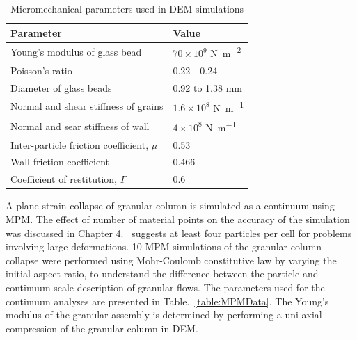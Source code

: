 \begin{table}
\caption{Micromechanical parameters used in DEM simulations}
\label{table:MDdata}
\centering
\begin{tabular}{ll}
\toprule
\textbf{Parameter} & \textbf{Value} \\ \midrule
Young's modulus of glass bead & $70\times10^{9}$ \si{\newton\per\m\squared}\\ 
Poisson's ratio & 0.22 - 0.24\\ 
Diameter of glass beads & 0.92 to 1.38 \si{\mm}\\
Normal and shear stiffness of grains & $1.6 \times 10^{8}$ \si{\newton\per\m}\\ 
Normal and sear stiffness of wall & $4 \times 10^{8}$ \si{\newton\per\m}\\
Inter-particle friction coefficient, $\mu$ & 0.53 \\
Wall friction coefficient & 0.466 \\ 
Coefficient of restitution, $\Gamma$ & 0.6 \\ \bottomrule
\end{tabular}
\end{table}

A plane strain collapse of granular column is simulated as a continuum using 
MPM. The effect of number of material points on the accuracy of the simulation 
was discussed in Chapter 4.~\citet{Guilkey2003} suggests at least four 
particles per cell for problems involving large deformations. 10 MPM 
simulations of the granular column collapse were performed using Mohr-Coulomb 
constitutive law by varying the initial aspect ratio, to understand the 
difference between the particle and continuum scale description of granular 
flows. The parameters used for the continuum analyses are presented in 
Table.~\ref{table:MPMData}. The Young's modulus of the granular assembly is 
determined by performing a uni-axial compression of the granular column in 
DEM.

